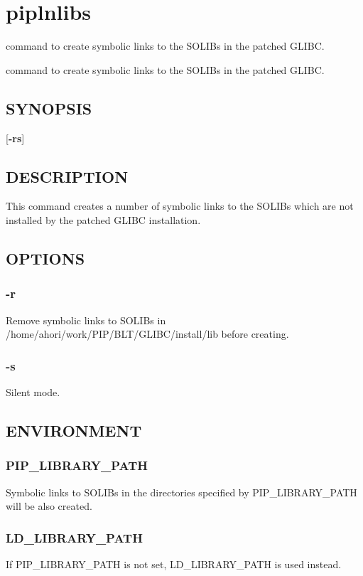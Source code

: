 \hypertarget{group__piplnlibs}{\section{piplnlibs}
\label{group__piplnlibs}
}


command to create symbolic links to the S\-O\-L\-I\-Bs in the patched G\-L\-I\-B\-C.  


command to create symbolic links to the S\-O\-L\-I\-Bs in the patched G\-L\-I\-B\-C. \hypertarget{group__piplnlibs_synopsis}{}\subsection{S\-Y\-N\-O\-P\-S\-I\-S}\label{group__piplnlibs_synopsis}
{ }\mbox{[}{\bfseries -\/rs}\mbox{]}\hypertarget{group__piplnlibs_description}{}\subsection{D\-E\-S\-C\-R\-I\-P\-T\-I\-O\-N}\label{group__piplnlibs_description}
This command creates a number of symbolic links to the S\-O\-L\-I\-Bs which are not installed by the patched G\-L\-I\-B\-C installation.\hypertarget{group__piplnlibs_options}{}\subsection{O\-P\-T\-I\-O\-N\-S}\label{group__piplnlibs_options}
\hypertarget{group__piplnlibs_remove}{}\subsubsection{-\/r}\label{group__piplnlibs_remove}
Remove symbolic links to S\-O\-L\-I\-Bs in /home/ahori/work/\-P\-I\-P/\-B\-L\-T/\-G\-L\-I\-B\-C/install/lib before creating.\hypertarget{group__piplnlibs_silent}{}\subsubsection{-\/s}\label{group__piplnlibs_silent}
Silent mode.\hypertarget{group__piplnlibs_environment}{}\subsection{E\-N\-V\-I\-R\-O\-N\-M\-E\-N\-T}\label{group__piplnlibs_environment}
\hypertarget{group__piplnlibs_PIP_LIBRARY_PATH}{}\subsubsection{P\-I\-P\-\_\-\-L\-I\-B\-R\-A\-R\-Y\-\_\-\-P\-A\-T\-H}\label{group__piplnlibs_PIP_LIBRARY_PATH}
Symbolic links to S\-O\-L\-I\-Bs in the directories specified by P\-I\-P\-\_\-\-L\-I\-B\-R\-A\-R\-Y\-\_\-\-P\-A\-T\-H will be also created.\hypertarget{group__piplnlibs_LD_LIBRARY_PATH}{}\subsubsection{L\-D\-\_\-\-L\-I\-B\-R\-A\-R\-Y\-\_\-\-P\-A\-T\-H}\label{group__piplnlibs_LD_LIBRARY_PATH}
If P\-I\-P\-\_\-\-L\-I\-B\-R\-A\-R\-Y\-\_\-\-P\-A\-T\-H is not set, L\-D\-\_\-\-L\-I\-B\-R\-A\-R\-Y\-\_\-\-P\-A\-T\-H is used instead. 